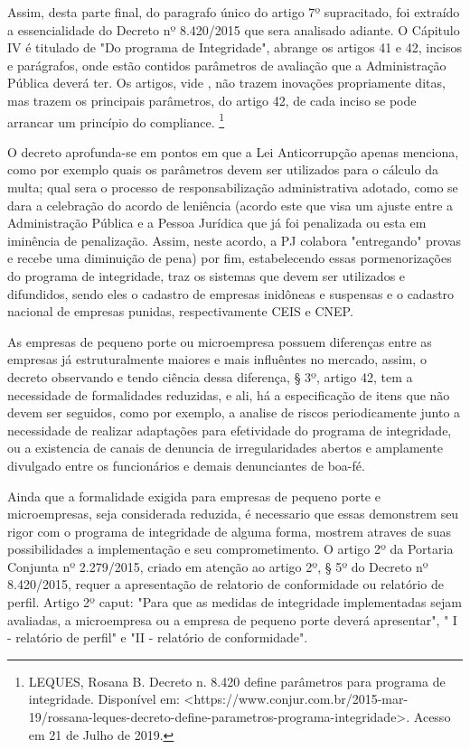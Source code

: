  Assim, desta parte final, do paragrafo único do artigo 7º supracitado, foi extraído a essencialidade do Decreto nº 8.420/2015 que sera analisado adiante. O Cápitulo IV é titulado de "Do programa de Integridade", abrange os artigos 41 e 42, incisos e parágrafos, onde estão contidos parâmetros de avaliação que a Administração Pública deverá ter. Os artigos, vide \cite{DecetoCometarios}, não trazem inovações propriamente ditas, mas trazem os principais parâmetros, do artigo 42, de cada inciso se pode arrancar um princípio do compliance. \footnote{LEQUES, Rosana B. Decreto n. 8.420 define parâmetros para 
programa de integridade. Disponível em: <https://www.conjur.com.br/2015-mar-19/rossana-leques-decreto-define-parametros-programa-integridade>. Acesso em 21 de Julho de 2019.}

O decreto aprofunda-se em pontos em que a Lei Anticorrupção apenas menciona, como por exemplo quais os parâmetros devem ser utilizados para o cálculo da multa; qual sera o processo de responsabilização administrativa adotado, como se dara a celebração do acordo de leniência (acordo este que visa um ajuste entre a Administração Pública e a Pessoa Jurídica que já foi penalizada ou esta em iminência de penalização. Assim, neste acordo, a PJ colabora "entregando" provas e recebe uma diminuição de pena) por fim, estabelecendo essas pormenorizações do programa de integridade, traz os sistemas que devem ser utilizados e difundidos, sendo eles o cadastro de empresas inidôneas e suspensas e o cadastro nacional de empresas punidas, respectivamente CEIS e CNEP. 

As empresas de pequeno porte ou microempresa possuem diferenças entre as empresas já estruturalmente maiores e mais influêntes no mercado, assim, o decreto observando e tendo ciência dessa diferença, § 3º, artigo 42, tem a necessidade de formalidades reduzidas, e ali, há a especificação de itens que não devem ser seguidos, como por exemplo, a analise de riscos periodicamente junto a necessidade de realizar adaptações para efetividade do programa de integridade, ou a existencia de canais de denuncia de irregularidades abertos e amplamente divulgado entre os funcionários  e demais denunciantes de boa-fé.

Ainda que a formalidade exigida para empresas de pequeno porte e microempresas, seja considerada reduzida, é necessario que essas demonstrem seu rigor com o programa de integridade de alguma forma, mostrem atraves de suas possibilidades a implementação e seu comprometimento. O artigo 2º da Portaria Conjunta nº 2.279/2015, criado em atenção ao artigo 2º, § 5º do Decreto nº 8.420/2015, requer a apresentação de relatorio de conformidade ou relatório de perfil. Artigo 2º caput: "Para que as medidas de integridade implementadas sejam avaliadas, a microempresa ou a empresa de pequeno porte deverá apresentar", "  I - relatório de perfil" e "II - relatório de conformidade". 

